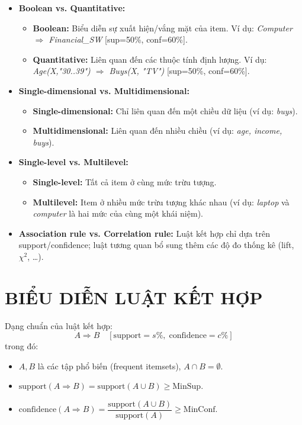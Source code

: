 \documentclass[10pt]{article}
\begin{document}
\begin{itemize}
    \item \textbf{Boolean vs. Quantitative:}
    \begin{itemize}
        \item \textbf{Boolean:} Biểu diễn sự xuất hiện/vắng mặt của item. Ví dụ: \textit{Computer $\Rightarrow$ Financial\_SW} [sup=50\%, conf=60\%].
        \item \textbf{Quantitative:} Liên quan đến các thuộc tính định lượng. Ví dụ: \textit{Age(X,"30..39") $\Rightarrow$ Buys(X, "TV")} [sup=50\%, conf=60\%].
    \end{itemize}
    \item \textbf{Single-dimensional vs. Multidimensional:}
    \begin{itemize}
        \item \textbf{Single-dimensional:} Chỉ liên quan đến một chiều dữ liệu (ví dụ: \textit{buys}).
        \item \textbf{Multidimensional:} Liên quan đến nhiều chiều (ví dụ: \textit{age, income, buys}).
    \end{itemize}
    \item \textbf{Single-level vs. Multilevel:}
    \begin{itemize}
        \item \textbf{Single-level:} Tất cả item ở cùng mức trừu tượng.
        \item \textbf{Multilevel:} Item ở nhiều mức trừu tượng khác nhau (ví dụ: \textit{laptop} và \textit{computer} là hai mức của cùng một khái niệm).
    \end{itemize}
    \item \textbf{Association rule vs. Correlation rule:} Luật kết hợp chỉ dựa trên support/confidence; luật tương quan bổ sung thêm các độ đo thống kê (lift, $\chi^2$, \ldots).
\end{itemize}

\section{BIỂU DIỄN LUẬT KẾT HỢP}

Dạng chuẩn của luật kết hợp:
\[
A \Rightarrow B \quad [\text{support} = s\%, \; \text{confidence} = c\%]
\]
trong đó:
\begin{itemize}
    \item $A, B$ là các tập phổ biến (frequent itemsets), $A \cap B = \emptyset$.
    \item $\text{support}(A \Rightarrow B) = \text{support}(A \cup B) \geq \text{MinSup}$.
    \item $\text{confidence}(A \Rightarrow B) = \dfrac{\text{support}(A \cup B)}{\text{support}(A)} \geq \text{MinConf}$.
\end{itemize}
\end{document}
